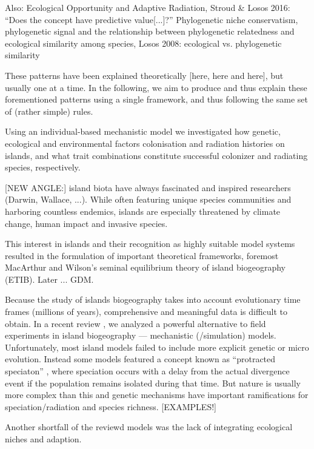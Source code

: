 \documentclass[a4paper]{scrartcl}
\begin{document}
Also: Ecological Opportunity and Adaptive Radiation, Stroud \& Losos 2016: ``Does the concept have predictive value[...]?'' \cite{stroud2016ecological}
Phylogenetic niche conservatism, phylogenetic signal and the relationship between phylogenetic relatedness and ecological similarity among species, Losos 2008: ecological vs. phylogenetic similarity \cite{losos2008phylogenetic}

These patterns have been explained theoretically [here, here and here], but usually one at a time.
In the following, we aim to produce and thus explain these forementioned patterns using a single framework, and thus following the same set of (rather simple) rules.

Using an individual-based mechanistic model we investigated how genetic, ecological and environmental factors colonisation and radiation histories on islands,
and what trait combinations constitute successful colonizer and radiating species, respectively.

[NEW ANGLE:]
island biota have always fascinated and inspired researchers (Darwin, Wallace, ...).
While often featuring unique species communities and harboring countless endemics,
islands are especially threatened by climate change, human impact and invasive species.

This interest in islands and their recognition as highly suitable model systems resulted in the formulation of
important theoretical frameworks, foremost MacArthur and Wilson's seminal equilibrium theory of island biogeography (ETIB).
Later ... GDM.

Because the study of islands biogeography takes into account evolutionary time frames (millions of years),
comprehensive and meaningful data is difficult to obtain.
In a recent review \cite{leidinger2017biodiversity}, we analyzed a powerful alternative to field experiments in island biogeography
--- mechanistic (/simulation) models.
Unfortunately, most island models failed to include more explicit genetic or micro evolution.
Instead some models featured a concept known as ``protracted speciaton'' \cite{rosindellXXX}, where speciation occurs with a delay from the actual
divergence event if the population remains isolated during that time.
But nature is usually more complex than this and genetic mechanisms have important ramifications for speciation/radiation and species richness.
[EXAMPLES!]

Another shortfall of the reviewd models was the lack of integrating ecological niches and adaption.
\end{document}
